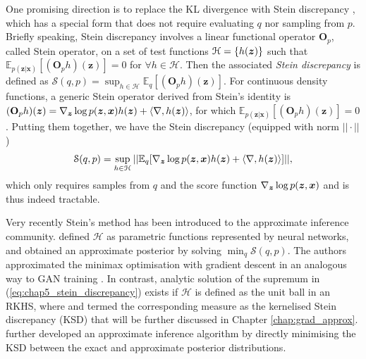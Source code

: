 One promising direction is to replace the KL divergence with Stein discrepancy \citep{stein:stein_method1972, barbour:stein_method1988, gorham:stein_method2015}, which has a special form that does not require evaluating $q$ nor sampling from $p$. 
Briefly speaking, Stein discrepancy involves a linear functional operator $\mathbf{O}_p$, called Stein operator, on a set of test functions $\mathcal{H} = \{ h(\bm{z}) \}$ such that $\mathbb{E}_{p(\bm{z}|\bm{x})}[(\mathbf{O}_p h)(\bm{z})] = 0$ for $\forall h \in \mathcal{H}$. Then the associated \emph{Stein discrepancy} is defined as $\mathcal{S}(q,  p) = \sup_{h \in \mathcal{H}} \mathbb{E}_{q}[(\mathbf{O}_p h)(\bm{z})]$. 
For continuous density functions, a generic Stein operator derived from Stein's identity \citep{stein:stein_method1972, stein:stein_method_multi1981} is $(\mathbf{O}_p h)(\bm{z}) = \nabla_{\bm{z}}\log p(\bm{z}, \bm{x}) h(\bm{z}) + \langle \nabla, h(\bm{z}) \rangle$, for which $\mathbb{E}_{p(\bm{z}|\bm{x})}[(\mathbf{O}_p h)(\bm{z})] = 0$. Putting them together, we have the Stein discrepancy (equipped with norm $|| \cdot ||$) \citep{gorham:stein_method2015}
\begin{equation}
\mathcal{S}(q, p) = \sup_{h \in \mathcal{H}} || \mathbb{E}_{q} [ \nabla_{\bm{z}}\log p(\bm{z}, \bm{x}) h(\bm{z}) + \langle \nabla, h(\bm{z}) \rangle ] ||,
\label{eq:chap5_stein_discrepancy}
\end{equation}
which only requires samples from $q$ and the score function $\nabla_{\bm{z}} \log p(\bm{z}, \bm{x})$ and is thus indeed tractable.

Very recently Stein's method has been introduced to the approximate inference community. \cite{ranganath:ovi2016} defined $\mathcal{H}$ as parametric functions represented by neural networks, and obtained an approximate posterior by solving $\min_{q} \mathcal{S}(q, p)$. The authors approximated the minimax optimisation with gradient descent in an analogous way to GAN training \citep{goodfellow:gan2014}. In contrast, analytic solution of the supremum in (\ref{eq:chap5_stein_discrepancy}) exists if $\mathcal{H}$ is defined as the unit ball in an RKHS, where \cite{liu:ksd2016} and \cite{chwialkowski:ksd2016} termed the corresponding measure as the kernelised Stein discrepancy (KSD) that will be further discussed in Chapter \ref{chap:grad_approx}. \cite{liu:two_wild2016} further developed an approximate inference algorithm by directly minimising the KSD between the exact and approximate posterior distributions.

